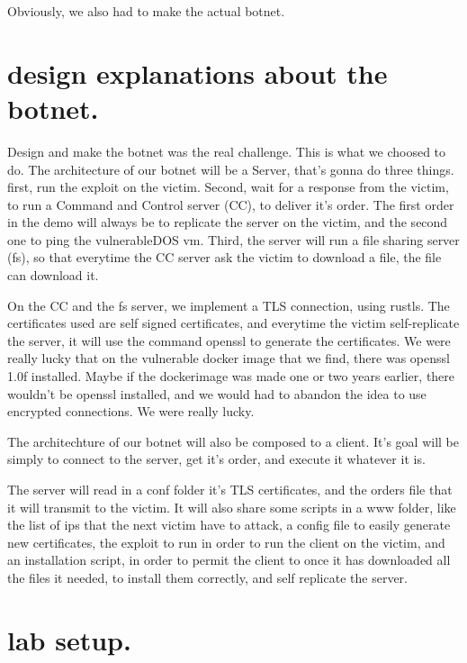 \documentclass[../main.tex]{subfiles}
\begin{document}
\begin{itemize}
    \end{itemize}

    Obviously, we also had to make the actual botnet.

    \vspace{10pt}

    \section{design explanations about the botnet.}

    Design and make the botnet was the real challenge. 
    This is what we choosed to do.
    The architecture of our botnet will be a Server, that's gonna do three things.
    first, run the exploit on the victim.
    Second, wait for a response from the victim, to run a Command and Control server (CC), to deliver it's order.
    The first order in the demo will always be to replicate the server on the victim, and the second one to ping the vulnerableDOS vm.
    Third, the server will run a file sharing server (fs), so that everytime the CC server ask the victim to download a file, the file can download it.

    On the CC and the fs server, we implement a TLS connection, using rustls. 
    The certificates used are self signed certificates, and everytime the victim self-replicate the server, it will use the command openssl to generate the certificates.
    We were really lucky that on the vulnerable docker image that we find, there was openssl 1.0f installed. 
    Maybe if the dockerimage was made one or two years earlier, there wouldn't be openssl installed, and we would had to abandon the idea to use encrypted connections.
    We were really lucky.

    The architechture of our botnet will also be composed to a client.
    It's goal will be simply to connect to the server, get it's order, and execute it whatever it is.

    The server will read in a conf folder it's TLS certificates, and the orders file that it will transmit to the victim.
    It will also share some scripts in a www folder, like the list of ips that the next victim have to attack, a config file to easily generate new certificates, the exploit to run in order to run the client on the victim, and an installation script, in order to permit the client to once it has downloaded all the files it needed, to install them correctly, and self replicate the server.

    \vspace{10pt}

    \section{lab setup.}
\end{document}
